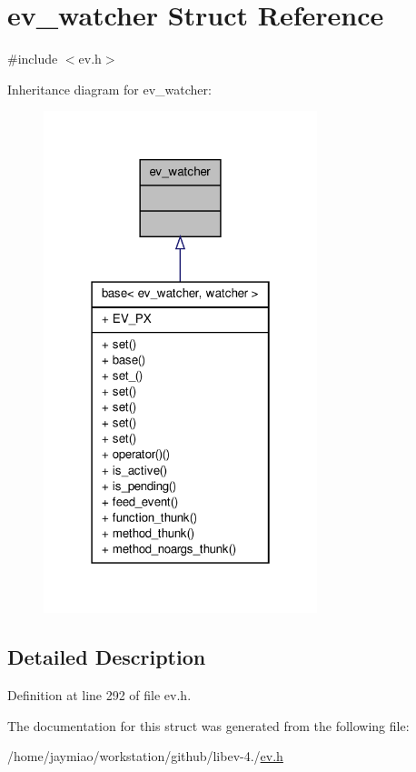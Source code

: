 \hypertarget{structev__watcher}{\section{ev\-\_\-watcher \-Struct \-Reference}
\label{structev__watcher}
}


{\ttfamily \#include $<$ev.\-h$>$}



\-Inheritance diagram for ev\-\_\-watcher\-:
\nopagebreak
\begin{figure}[H]
\begin{center}
\leavevmode
\includegraphics[width=226pt]{structev__watcher__inherit__graph}
\end{center}
\end{figure}


\subsection{\-Detailed \-Description}


\-Definition at line 292 of file ev.\-h.



\-The documentation for this struct was generated from the following file\-:\begin{DoxyCompactItemize}
\item 
/home/jaymiao/workstation/github/libev-\/4./\hyperlink{ev_8h}{ev.\-h}\end{DoxyCompactItemize}
